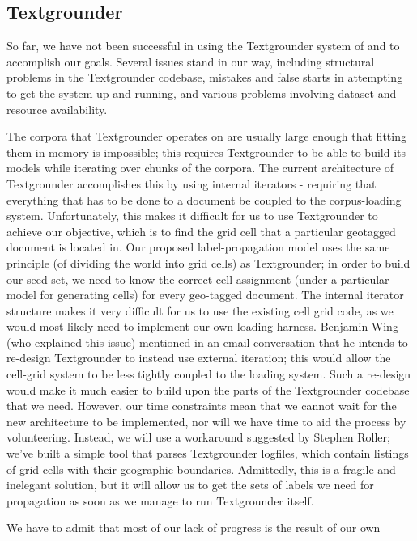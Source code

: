 \subsection{Textgrounder}
So far, we have not been successful in using the Textgrounder system of
\cite{wing-baldridge:11} and \cite{rolleretal:12} to accomplish our goals. 
Several issues stand in our way, including structural problems in the
Textgrounder codebase, mistakes and false starts in attempting to get
the system up and running, and various problems involving dataset and resource
availability.
\par
The corpora that Textgrounder operates on are usually large enough that fitting them
in memory is impossible; this requires Textgrounder to be able to
build its models while iterating over chunks of the corpora.
The current architecture of Textgrounder accomplishes this by using internal
iterators - requiring that everything that has to be done to a document be
coupled to the corpus-loading system.
Unfortunately, this makes it difficult for us to use Textgrounder to achieve
our objective, which is to find the grid cell that a particular geotagged document is located in.
Our proposed label-propagation model uses the same principle (of dividing the
world into grid cells) as Textgrounder; in order to build our seed set, we need to
know the correct cell assignment (under a particular model for generating
cells) for every geo-tagged document.
The internal iterator structure makes it very difficult for us to use the
existing cell grid code, as we would most likely need to implement our own
loading harness.
Benjamin Wing (who explained this issue) mentioned in an email conversation that he intends to re-design
Textgrounder to instead use external iteration; this would allow the cell-grid
system to be less tightly coupled to the loading system.
Such a re-design would make it much easier to build upon the parts of the
Textgrounder codebase that we need. However, our time constraints mean that we cannot wait for the new architecture to be implemented, nor will we have
time to aid the process by volunteering.
Instead, we will use a workaround suggested by Stephen Roller; we've built a
simple tool that parses Textgrounder logfiles, which contain listings of grid
cells with their geographic boundaries.
Admittedly, this is a fragile and inelegant solution, but it will allow us to
get the sets of labels we need for propagation as soon as we manage to run
Textgrounder itself.
\par
We have to admit that most of our lack of progress is the result of our own
